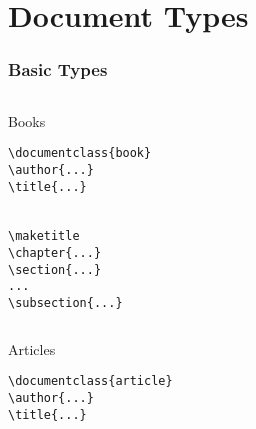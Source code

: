 
\section{Document Types}

\begin{frame}
\frametitle{Basic Types}
\begin{columns}
\begin{column}{.35\textwidth}
\begin{beamerboxesrounded}[width=\linewidth]{Books}
\begin{lstlisting}[moretexcs={chapter,subsection,maketitle}, basicstyle={\ttfamily}, emph={book}]
\documentclass{book}
\author{...}
\title{...}


\maketitle
\chapter{...}
\section{...}
...
\subsection{...}

\end{lstlisting}
\end{beamerboxesrounded}
\end{column}
\begin{column}{.58\textwidth}
\centering
{}
\end{column}
\end{columns}

\begin{columns}
\begin{column}{.4\textwidth}
\begin{beamerboxesrounded}[width=\linewidth]{Articles}
\begin{lstlisting}[moretexcs={chapter,subsection,maketitle}, basicstyle={\ttfamily}, emph={article}]
\documentclass{article}
\author{...}
\title{...}



\end{lstlisting}
\end{beamerboxesrounded}
\end{column}
\end{columns}
\end{frame}

